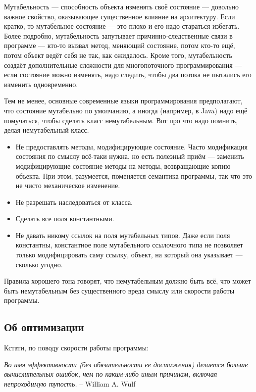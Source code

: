 \documentclass[a5paper]{article}
\begin{document}
Мутабельность --- способность объекта изменять своё состояние --- довольно важное свойство, оказывающее существенное влияние на архитектуру. Если кратко, то мутабельное состояние --- это плохо и его надо стараться избегать. Более подробно, мутабельность запутывает причинно-следственные связи в программе --- кто-то вызвал метод, меняющий состояние, потом кто-то ещё, потом объект ведёт себя не так, как ожидалось. Кроме того, мутабельность создаёт дополнительные сложности для многопоточного программирования --- если состояние можно изменять, надо следить, чтобы два потока не пытались его изменить одновременно.

Тем не менее, основные современные языки программирования предполагают, что состояние мутабельно по умолчанию, а иногда (например, в Java) надо ещё помучаться, чтобы сделать класс немутабельным. Вот про что надо помнить, делая немутабельный класс.

\begin{itemize}
	\item Не предоставлять методы, модифицирующие состояние. Часто модификация состояния по смыслу всё-таки нужна, но есть полезный приём --- заменить модифицирующие состояние методы на методы, возвращающие копию объекта. При этом, разумеется, поменяется семантика программы, так что это не чисто механическое изменение.
	\item Не разрешать наследоваться от класса.
	\item Сделать все поля константными.
	\item Не давать никому ссылок на поля мутабельных типов. Даже если поля константны, константное поле мутабельного ссылочного типа не позволяет только модифицировать саму ссылку, объект, на который она указывает --- сколько угодно.
\end{itemize}

Правила хорошего тона говорят, что немутабельным должно быть всё, что может быть немутабельным без существенного вреда смыслу или скорости работы программы.

\subsection{Об оптимизации}

Кстати, по поводу скорости работы программы:

\textit{Во имя эффективности (без обязательности ее достижения) делается больше вычислительных ошибок, чем по каким-либо иным причинам, включая непроходимую тупость.} \newline
-- William A. Wulf 
\end{document}
